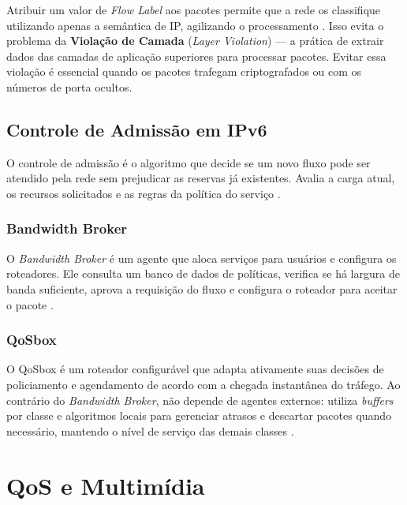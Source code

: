Atribuir um valor de \textit{Flow Label} aos pacotes permite que a rede os
classifique utilizando apenas a semântica de IP, agilizando o processamento
\cite{ieee_ipv6qos}. Isso evita o problema da \textbf{Violação de Camada}
(\textit{Layer Violation}) — a prática de extrair dados das camadas de aplicação
superiores para processar pacotes. Evitar essa violação é essencial quando os
pacotes trafegam criptografados ou com os números de porta ocultos.

\subsection{Controle de Admissão em IPv6}

O controle de admissão é o algoritmo que decide se um novo fluxo pode ser
atendido pela rede sem prejudicar as reservas já existentes. Avalia a carga atual,
os recursos solicitados e as regras da política do serviço \cite{ieee_ipv6qos}.

\subsubsection{Bandwidth Broker}

O \textit{Bandwidth Broker} é um agente que aloca serviços para usuários e
configura os roteadores. Ele consulta um banco de dados de políticas, verifica se
há largura de banda suficiente, aprova a requisição do fluxo e configura o
roteador para aceitar o pacote \cite{ieee_ipv6qos}.

\subsubsection{QoSbox}

O QoSbox é um roteador configurável que adapta ativamente suas decisões de
policiamento e agendamento de acordo com a chegada instantânea do tráfego. Ao
contrário do \textit{Bandwidth Broker}, não depende de agentes externos: utiliza
\textit{buffers} por classe e algoritmos locais para gerenciar atrasos e descartar
pacotes quando necessário, mantendo o nível de serviço das demais classes
\cite{ieee_ipv6qos}.

\section{QoS e Multimídia}

